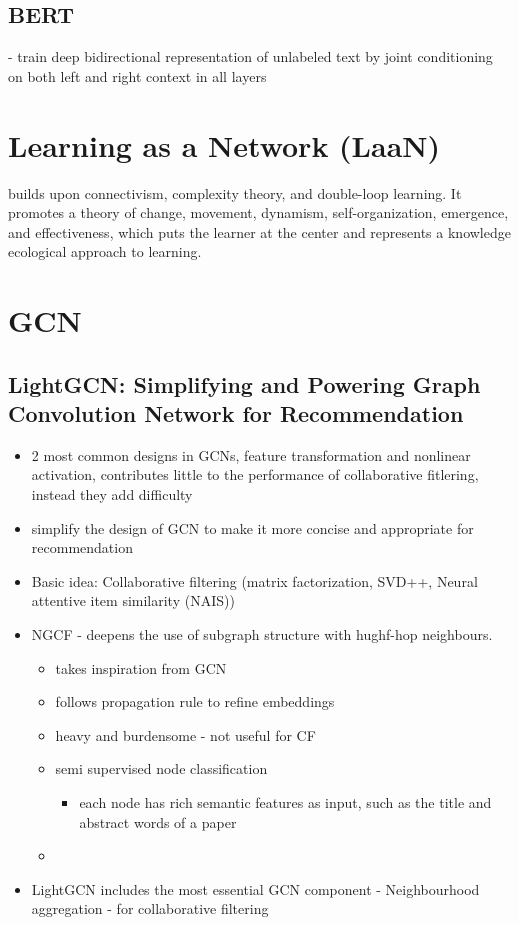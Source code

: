 \documentclass{report}
\begin{document}
\section{BERT}
- train deep bidirectional representation of unlabeled text by joint conditioning on both left and right context in all layers

\chapter{Learning as a Network (LaaN)}
builds upon connectivism, complexity theory, and double-loop learning. It promotes a theory of change, movement, dynamism, self-organization, emergence, and effectiveness, which puts the learner at the center and represents a knowledge ecological approach to learning. 


\chapter{GCN}
\section{LightGCN: Simplifying and Powering Graph Convolution Network for Recommendation}

\begin{itemize}
    \item 2 most common designs in GCNs, feature transformation and nonlinear activation, contributes little to the performance of collaborative fitlering, instead they add difficulty
    \item simplify the design of GCN to make it more concise and appropriate for recommendation 
    \item Basic idea: Collaborative filtering (matrix factorization, SVD++, Neural attentive item similarity (NAIS))
    \item NGCF - deepens the use of subgraph structure with hughf-hop neighbours. 
    \begin{itemize}
        \item takes inspiration from GCN
        \item follows propagation rule to refine embeddings
        \item heavy and burdensome - not useful for CF
        \item semi supervised node classification 
        \begin{itemize}
            \item each node has rich semantic features as input, such as the title and abstract words of a paper
        \end{itemize}
        \item 
    \end{itemize}
    \item LightGCN includes the most essential GCN component - Neighbourhood aggregation - for collaborative filtering
\end{itemize}
\end{document}
